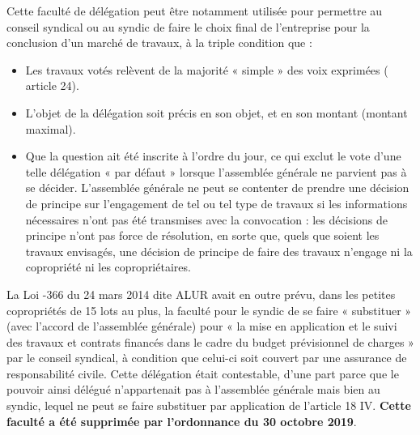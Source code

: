			Cette faculté de délégation peut être notamment utilisée pour permettre au conseil syndical ou au syndic de faire le choix final de l’entreprise pour la conclusion d’un marché de travaux, à la triple condition que :
			\begin{itemize}
				\item Les travaux votés relèvent de la majorité « simple » des voix exprimées ( article 24).
				
				\item L’objet de la délégation soit précis en son objet, et en son montant (montant maximal).
				
				\item Que la question ait été inscrite à l’ordre du jour, ce qui exclut le vote d’une telle délégation « par défaut » lorsque l’assemblée générale ne parvient pas à se décider. L’assemblée générale ne peut se contenter de prendre une décision de principe sur l’engagement de tel ou tel type de travaux si les informations nécessaires n’ont pas été transmises avec la convocation : les décisions de principe n’ont pas force de résolution, en sorte que, quels que soient les travaux envisagés, une décision de principe de faire des travaux n’engage ni la copropriété ni les copropriétaires.
			\end{itemize}
			
			La Loi -366 du 24 mars 2014 dite ALUR avait en outre prévu, dans les petites copropriétés de 15 lots au plus, la faculté pour le syndic de se faire « substituer » (avec l’accord de l’assemblée générale) pour « la mise en application et le suivi des travaux et contrats financés dans le cadre du budget prévisionnel de charges » par le conseil syndical, à condition que celui-ci soit couvert par une assurance de responsabilité civile. Cette délégation était contestable, d’une part parce que le pouvoir ainsi délégué n’appartenait pas à l’assemblée générale mais bien au syndic, lequel ne peut se faire substituer par application de l’article 18 IV. \textbf{Cette faculté a été supprimée par l’ordonnance du 30 octobre 2019}.
			
